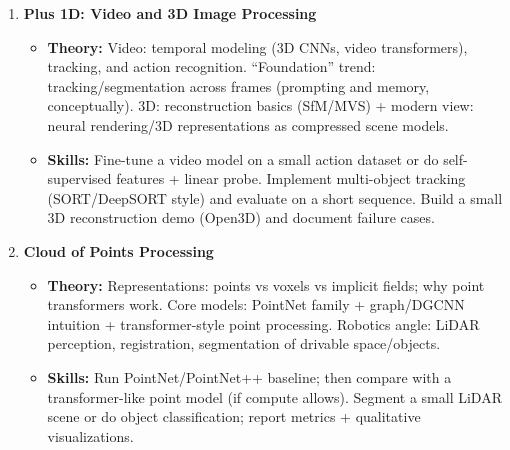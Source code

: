 \documentclass[a4paper,11pt]{texMemo}
\begin{document}
\begin{enumerate}
\item \textbf{Plus 1D: Video and 3D Image Processing}
\citep{maturana2015voxnet, Wang_2017, mao2021voxeltransformer3dobject, prince2023understanding, singh20203d}
\begin{itemize}
    \item \textbf{Theory:}
    Video: temporal modeling (3D CNNs, video transformers), tracking, and action recognition.
    ``Foundation'' trend: tracking/segmentation across frames (prompting and memory, conceptually).
    3D: reconstruction basics (SfM/MVS) + modern view: neural rendering/3D representations as compressed scene models.
    \item \textbf{Skills:}
    Fine-tune a video model on a small action dataset or do self-supervised features + linear probe.
    Implement multi-object tracking (SORT/DeepSORT style) and evaluate on a short sequence.
    Build a small 3D reconstruction demo (Open3D) and document failure cases.
\end{itemize}

\item \textbf{Cloud of Points Processing}
\citep{YandexHandbookML, qi2017pointnetdeeplearningpoint, lai2022stratified}
\begin{itemize}
    \item \textbf{Theory:}
    Representations: points vs voxels vs implicit fields; why point transformers work.
    Core models: PointNet family + graph/DGCNN intuition + transformer-style point processing.
    Robotics angle: LiDAR perception, registration, segmentation of drivable space/objects.
    \item \textbf{Skills:}
    Run PointNet/PointNet++ baseline; then compare with a transformer-like point model (if compute allows).
    Segment a small LiDAR scene or do object classification; report metrics + qualitative visualizations.
\end{itemize}




\end{enumerate}
\end{document}
